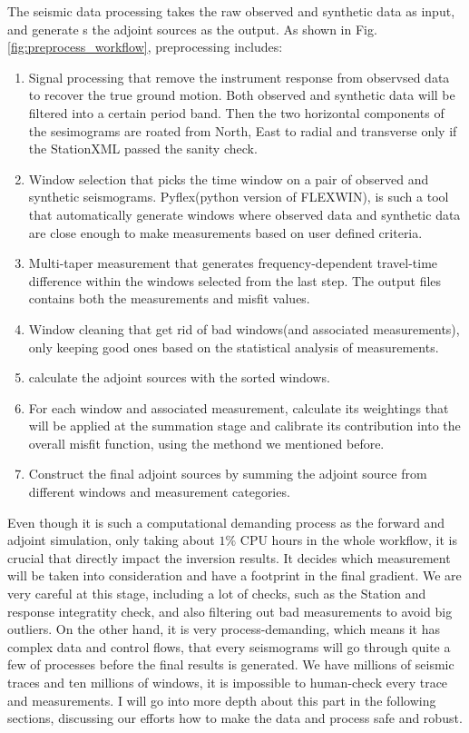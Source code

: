 \documentclass[extra,mreferee]{gji}
\begin{document}
The seismic data processing takes the raw observed and synthetic data as input,
and generate s the adjoint sources as the output. As shown
in Fig.\ref{fig:preprocess_workflow}, preprocessing includes:
\begin{enumerate}
  \item Signal processing that remove the instrument response from observsed data
    to recover the true ground motion. Both observed and synthetic data will be
    filtered into a certain period band. Then the two horizontal components of the
    sesimograms are roated from North, East to radial and transverse only if the
    StationXML passed the sanity check.
  \item Window selection that picks the time window on a pair of
    observed and synthetic seismograms. Pyflex(python version
    of FLEXWIN\citep{maggi2009automated}), is
    such a tool that automatically generate windows where observed data and
    synthetic data are close enough to make measurements based on user defined
    criteria.
  \item Multi-taper measurement that generates frequency-dependent travel-time
    difference within the windows selected from the last step.
    The output files contains both the measurements and misfit values.
  \item Window cleaning that get rid of bad windows(and associated
    measurements), only keeping good ones based on the statistical analysis of
    measurements.
  \item calculate the adjoint sources with the sorted windows.
  \item For each window and associated measurement, calculate its weightings
    that will be applied at the summation stage and calibrate its contribution
    into the overall misfit function, using the methond we mentioned before.
  \item Construct the final adjoint sources by summing the adjoint source from
    different windows and measurement categories.
\end{enumerate}

Even though it is such a computational demanding process as the forward and adjoint
simulation, only taking about $1\%$ CPU hours in the whole workflow, it is crucial
that directly impact the inversion results. It decides which measurement
will be taken into consideration and have a footprint in the final gradient.
We are very careful at this stage, including a lot of checks, such as the Station and
response integratity check, and also filtering out bad measurements to avoid big outliers.
On the other hand, it is very process-demanding, which means it has complex data and
control flows, that every seismograms will go through quite a few of processes
before the final results is generated. We have millions of seismic traces and ten
millions of windows, it is impossible to human-check every trace and measurements.
I will go into more depth about this part in the following sections, discussing our
efforts how to make the data and process safe and robust.
\end{document}
